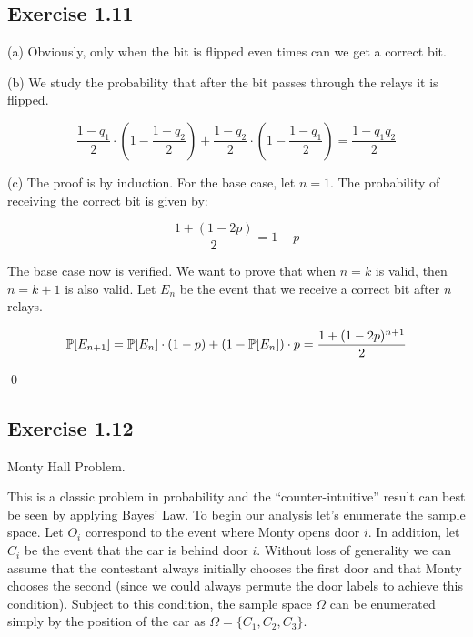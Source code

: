 \subsection*{Exercise 1.11}

\noindent (a) Obviously, only when the bit is flipped even times can we get a correct bit.

\noindent (b) We study the probability that after the bit passes through the relays it is flipped.

\begin{equation*}
\frac{1-q_1}{2} \cdot (1 - \frac{1-q_2}{2}) + \frac{1-q_2}{2} \cdot (1 - \frac{1-q_1}{2}) = \frac{1-q_1q_2}{2}
\end{equation*}

\noindent (c) 
The proof is by induction. For the base case, let $n = 1$. The probability of receiving the correct bit
is given by:

\begin{equation*}
\frac{1 + (1 - 2p)}{2} = 1 - p
\end{equation*}

The base case now is verified. We want to prove that when $n = k$ is valid, then $n = k+1$ is also valid.
Let $E_n$ be the event that we receive a correct bit after $n$ relays. 

\begin{equation*}
\P[E_{n+1}] = \P[E_n]\cdot (1-p) + (1 - \P[E_n]) \cdot p = \frac{1 + (1-2p)^{n+1}}{2}
\end{equation*}

\qed

\subsection*{Exercise 1.12}

Monty Hall Problem.

This is a classic problem in probability and the ``counter-intuitive'' result can best be seen by
applying Bayes' Law. To begin our analysis let's enumerate the sample space. Let $O_i$
correspond to the event where Monty opens door $i$. In addition, let $C_i$
be the event that the car is behind door $i$. 
Without loss of generality we can assume that the contestant always initially chooses the first
door and that Monty chooses the second (since we could always permute the door labels to achieve
this condition). Subject to this condition, the sample space $\Omega$ can be enumerated simply by the
position of the car as $\Omega = \{C_1, C_2, C_3\}$.

